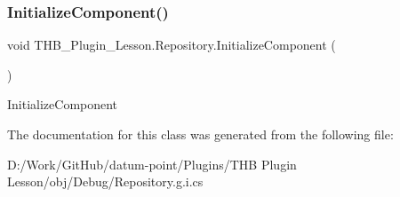 \subsubsection{\texorpdfstring{Initialize\+Component()}{InitializeComponent()}\hspace{0.1cm}{\footnotesize\ttfamily [2/2]}}
{\footnotesize\ttfamily void T\+H\+B\+\_\+\+Plugin\+\_\+\+Lesson.\+Repository.\+Initialize\+Component (\begin{DoxyParamCaption}{ }\end{DoxyParamCaption})}



Initialize\+Component 



The documentation for this class was generated from the following file\+:\begin{DoxyCompactItemize}
\item 
D\+:/\+Work/\+Git\+Hub/datum-\/point/\+Plugins/\+T\+H\+B Plugin Lesson/obj/\+Debug/Repository.\+g.\+i.\+cs\end{DoxyCompactItemize}
